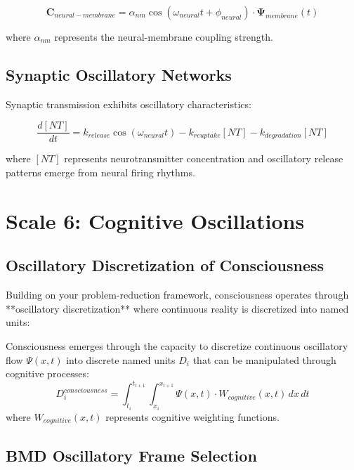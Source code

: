 \documentclass[twocolumn]{article}
\begin{document}
\begin{equation}
\mathbf{C}_{neural-membrane} = \alpha_{nm} \cos(\omega_{neural}t + \phi_{neural}) \cdot \mathbf{\Psi}_{membrane}(t)
\end{equation}

where $\alpha_{nm}$ represents the neural-membrane coupling strength.

\subsection{Synaptic Oscillatory Networks}

Synaptic transmission exhibits oscillatory characteristics:

\begin{equation}
\frac{d[NT]}{dt} = k_{release} \cos(\omega_{neural}t) - k_{reuptake}[NT] - k_{degradation}[NT]
\end{equation}

where $[NT]$ represents neurotransmitter concentration and oscillatory release patterns emerge from neural firing rhythms.

\section{Scale 6: Cognitive Oscillations}

\subsection{Oscillatory Discretization of Consciousness}

Building on your problem-reduction framework, consciousness operates through **oscillatory discretization** where continuous reality is discretized into named units:

\begin{theorem}
Consciousness emerges through the capacity to discretize continuous oscillatory flow $\Psi(x,t)$ into discrete named units $D_i$ that can be manipulated through cognitive processes:
\begin{equation}
D_i^{consciousness} = \int_{t_i}^{t_{i+1}} \int_{x_i}^{x_{i+1}} \Psi(x,t) \cdot W_{cognitive}(x,t) \, dx \, dt
\end{equation}
where $W_{cognitive}(x,t)$ represents cognitive weighting functions.
\end{theorem}

\subsection{BMD Oscillatory Frame Selection}
\end{document}
